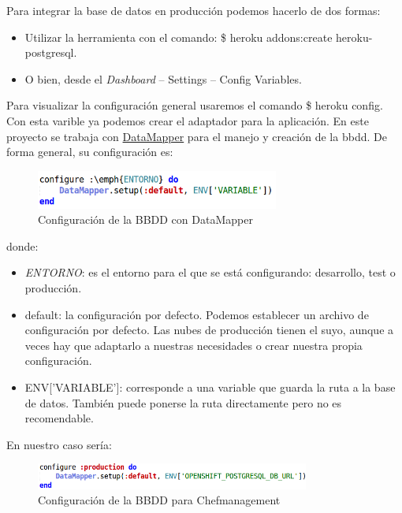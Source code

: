 Para integrar la base de datos en producción podemos hacerlo de dos formas:
\begin{itemize}
	\item Utilizar la herramienta con el comando: \$ heroku addons:create heroku-postgresql.
	\item O bien, desde el \emph{Dashboard} -- Settings -- Config Variables.
\end{itemize}

Para visualizar la configuración general usaremos el comando \$ heroku config. Con esta varible ya podemos crear el adaptador para la aplicación. En este proyecto se trabaja con \href{http://datamapper.org/}{DataMapper} para el manejo y creación de la bbdd. De forma general, su configuración es: \\

\begin{figure}[H]
	\centering
	\includegraphics[width=8cm]{./images/env01.png}
	\caption{Configuración de la BBDD con DataMapper} \label{fig:env01}
\end{figure}
 
 donde:
 \begin{itemize}
	 \item \emph{ENTORNO}: es el entorno para el que se está configurando: desarrollo, test o producción.
	\item default: la configuración por defecto. Podemos establecer un archivo de configuración por defecto. Las nubes de producción tienen el suyo, aunque a veces hay que adaptarlo a nuestras necesidades o crear nuestra propia configuración.
	\item ENV['VARIABLE']: corresponde a una variable que guarda la ruta a la base de datos. También puede ponerse la ruta directamente pero no es recomendable.
\end{itemize}

En nuestro caso sería: \\

\begin{figure}[H]
	\centering
	\includegraphics[width=9cm]{./images/env02.png}
	\caption{Configuración de la BBDD para Chefmanagement} \label{fig:env02}
\end{figure}

